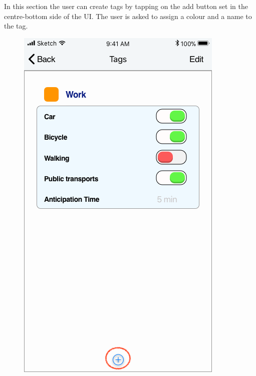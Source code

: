 In this section the user can create tags by tapping on the add button set in the centre-bottom side of the UI.
The user is asked to assign a colour and a name to the tag.
\begin{figure}[H]
	\centering
	\includegraphics[scale=0.23]{Images/Interface/Tags/1_tags+work_add}
	\hspace{0.5cm}

\end{figure}
